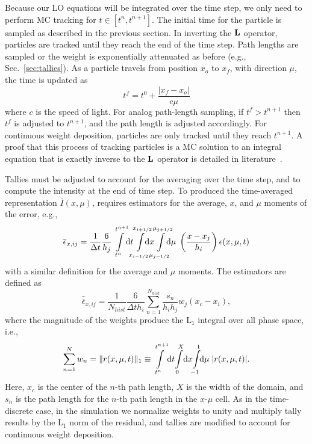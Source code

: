 Because our LO equations will be integrated over the time step, we only need to
perform MC tracking for $t\in[t^{n},t^{n+1}]$.  
The initial time for the particle is
sampled as described in the previous section. In inverting the $\mathbf{L}$ operator, particles
are tracked until they reach the end of the time step.  Path lengths are sampled or the
weight is exponentially attenuated as before (e.g., Sec.~\ref{sec:tallies}).  As a particle
travels from position $x_{o}$ to $x_{f}$, with direction $\mu$, the time is updated as 
\begin{equation}
    t^{f} = t^{0} + \frac{|x_{f} - x_{o}|}{c \mu}
\end{equation}
where $c$ is the speed of light. For analog path-length sampling, if $t^{f}>t^{n+1}$ then
$t^{f}$ is adjusted to $t^{n+1}$, and the path length is adjusted accordingly.  For continuous weight deposition, particles
are only tracked until they reach $t^{n+1}$.  A proof that this process of tracking
particles is a MC solution to an integral equation that is exactly inverse to the $\mathbf{L}$ operator is
detailed in literature~\cite{cj_thesis,shultis_mc}.  

Tallies must be adjusted to account for the averaging over the time step, and to compute the
intensity at the end of time step.  To produced the time-averaged representation
$\overline I(x,\mu)$, requires estimators for the average, $x$, and $\mu$ moments of the
error, e.g.,
\begin{equation}
    \overline\epsilon_{x,ij} = \frac{1}{\Delta t} \frac{6}{h_j}
    \int\limits_{t^{n}}^{t^{n+1}} \!\!\dd t \!\!\!
    \int\limits_{\xl}^{\xr} \!\!\!\!\! \dd x
    \hspace{-0.081in}\int\limits_{\mu_{j-1/2}}^{\mu_{j+1/2}} \hspace{-0.107in} \dd \mu
    \;\left(\frac{x - x_j}{h_{i}}\right) \epsilon(x,\mu,t)
\end{equation}
with a similar definition for the average and $\mu$ moments.  The estimators are defined
as
\begin{equation}
    \hat{\overline \epsilon}_{x,ij} =\frac{1}{N_{hist}} \frac{6}{\Delta t h_i} \sum_{n=1}^{N_{hist}}
    \frac{s_n}{h_{i}h_{j}} w_j \left(x_c - x_i\right),
\end{equation}
where the magnitude of the weights produce the L$_1$ integral over all phase space, i.e.,
\begin{equation}
\sum\limits_{n=1}^{N} w_n = \| r(x,\mu,t) \|_1 \equiv 
    \int\limits_{t^{n}}^{t^{n+1}} \!\dd t \!
    \int\limits_{0}^{X} \! \dd x
    \hspace{-0.0301in}\int\limits_{-1}^{1} \!\!\dd \mu\;
    |r(x,\mu,t)|.
\end{equation}
Here, $x_c$ is the center of the $n$-th
path length, $X$ is the width of the domain, and $s_{n}$ is the path length for the $n$-th path length in the $x$-$\mu$
cell. As in the time-discrete case, in the simulation we normalize weights to unity and
multiply tally results by the L$_1$ norm of the residual, and tallies are modified to
account for continuous weight deposition.

